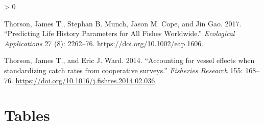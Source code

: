 \documentclass[11pt,
  english,
  a4paper,
]{article}
\newlength{\cslhangindent}
\newenvironment{CSLReferences}[2] %
 {%
  \setlength{\parindent}{0pt}
  \ifodd #1 \everypar{\setlength{\hangindent}{\cslhangindent}}\ignorespaces\fi
  \ifnum #2 > 0
  \setlength{\parskip}{#2\baselineskip}
  \fi
 }%
 {}
\begin{document}
\begin{CSLReferences}{1}{0}
\leavevmode\hypertarget{ref-thorson_predicting_2017}{}%
Thorson, James T., Stephan B. Munch, Jason M. Cope, and Jin Gao. 2017. {``Predicting Life History Parameters for All Fishes Worldwide.''} \emph{Ecological Applications} 27 (8): 2262--76. \url{https://doi.org/10.1002/eap.1606}.

\leavevmode\hypertarget{ref-Thorson2014}{}%
Thorson, James T., and Eric J. Ward. 2014. {``{Accounting for vessel effects when standardizing catch rates from cooperative surveys}.''} \emph{Fisheries Research} 155: 168--76. \url{https://doi.org/10.1016/j.fishres.2014.02.036}.

\end{CSLReferences}

\leavevmode\tagmcend\tagstructend

\clearpage


\hypertarget{tables}{%
\section{Tables}\label{tables}}

\leavevmode\tagmcend\tagstructend



\newpage



\newpage



\newpage



\newpage



\newpage

\begingroup\fontsize{9}{11}\selectfont
\end{document}
